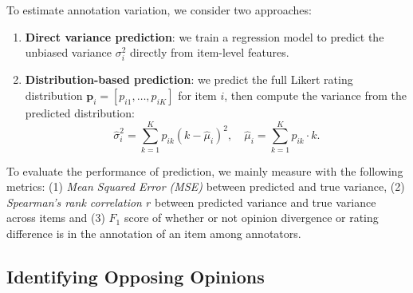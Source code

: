 \documentclass{article} %
\begin{document}
\vspace{10pt}
\noindent To estimate annotation variation, we consider two approaches:

\begin{enumerate}
    \item \textbf{Direct variance prediction}: we train a regression model to predict the unbiased variance \(\sigma_i^2\) directly from item-level features.
    \item \textbf{Distribution-based prediction}: we predict the full Likert rating distribution \(\mathbf{p}_i = [p_{i1}, \dots, p_{iK}]\) for item \(i\), then compute the variance from the predicted distribution:
    \begin{equation}
    \hat{\sigma}_i^2 = \sum_{k=1}^K p_{ik} (k - \hat{\mu}_i)^2, \quad 
    \hat{\mu}_i = \sum_{k=1}^K p_{ik} \cdot k.
    \end{equation}
\end{enumerate}

\noindent To evaluate the performance of prediction, we mainly measure with the following metrics: (1) \textit{Mean Squared Error (MSE)} between predicted and true variance, (2) \textit{Spearman's rank correlation $r$} between predicted variance and true variance across items and (3) $F_1$ score of whether or not opinion divergence or rating difference is in the annotation of an item among annotators.





\subsection{Identifying Opposing Opinions}\label{opposing_method}
\end{document}
